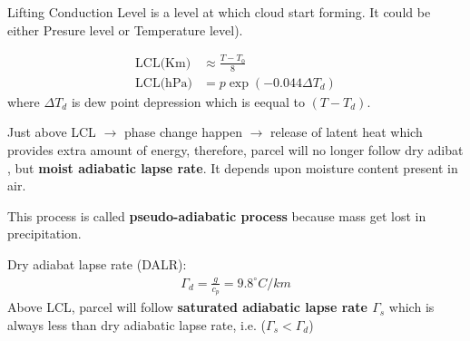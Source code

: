 \documentclass[fleqn,10pt]{SelfArx} %
\begin{document}
Lifting Conduction Level is a level at which cloud start forming. It could be either Presure level or Temperature level).




\begin{align}
    \text{LCL(Km)} &\approx \frac{T-T_0}{8} \\
    \text{LCL(hPa)} &= p \exp(-0.044\Delta T_d)
\end{align}
where $\Delta T_d$ is dew point depression which is eequal to $(T-T_d)$.

Just above LCL $\rightarrow$ phase change happen $\rightarrow$ release of latent heat which provides extra amount of energy, therefore, parcel will no longer follow dry adibat , but \textbf{moist adiabatic lapse rate}. It depends upon moisture content present in air.

This process is called \textbf{pseudo-adiabatic process} because mass get lost in precipitation.

Dry adiabat lapse rate (DALR):
\begin{align*}
    \Gamma_d = \frac{g}{c_p}= 9.8^\circ C/km
\end{align*}
Above LCL, parcel will follow \textbf{saturated adiabatic lapse rate $\Gamma_s$} which is always less than dry adiabatic lapse rate, i.e. ($\Gamma_s < \Gamma_d$)
\end{document}
